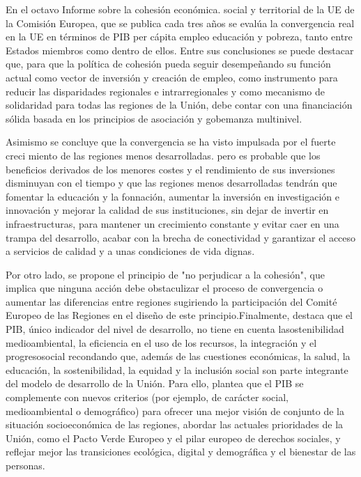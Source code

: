 \documentclass[10pt,a4paper]{article}
\begin{document}
En el octavo Informe sobre la cohesión económica. social y territorial de la UE de la Comisión Europea, que se publica cada tres años se evalúa la convergencia real en la UE en términos de PIB per cápita empleo educación y pobreza, tanto entre Estados miembros como dentro de ellos. Entre sus conclusiones se puede destacar que, para que la política de cohesión pueda seguir desempeñando su función actual como vector de inversión y creación de empleo, como instrumento para reducir las disparidades regionales e intrarregionales y como mecanismo de solidaridad para todas las regiones de la Unión, debe contar con una financiación sólida basada en los principios de asociación y gobemanza multinivel.

Asimismo se concluye que la convergencia se ha visto impulsada por el fuerte creci miento de las regiones menos desarrolladas. pero es probable que los beneficios derivados de los menores costes y el rendimiento de sus inversiones disminuyan con el tiempo y que las regiones menos desarrolladas tendrán que fomentar la educación y la fonnación, aumentar la inversión en investigación e innovación y mejorar la calidad de sus instituciones, sin dejar de invertir en infraestructuras, para mantener un crecimiento constante y evitar caer en una trampa del desarrollo, acabar con la brecha de conectividad y garantizar el acceso a servicios de calidad y a unas condiciones de vida dignas.

Por otro lado, se propone el principio de "no perjudicar a la cohesión", que implica que ninguna acción debe obstaculizar el proceso de convergencia o aumentar las diferencias entre regiones sugiriendo la participación del Comité Europeo de las Regiones en el diseño de este principio.Finalmente, destaca que el PIB, único indicador del nivel de desarrollo, no tiene en cuenta lasostenibilidad medioambiental, la eficiencia en el uso de los recursos, la integración y el progresosocial recondando que, además de las cuestiones económicas, la salud, la educación, la sostenibilidad, la equidad y la inclusión social son parte integrante del modelo de desarrollo de la Unión. Para ello, plantea que el PIB se complemente con nuevos criterios (por ejemplo, de carácter social, medioambiental o demográfico) para ofrecer una mejor visión de conjunto de la situación socioeconómica de las regiones, abordar las actuales prioridades de la Unión, como el Pacto Verde Europeo y el pilar europeo de derechos sociales, y reflejar mejor las transiciones ecológica, digital y demográfica y el bienestar de las personas.
\end{document}
